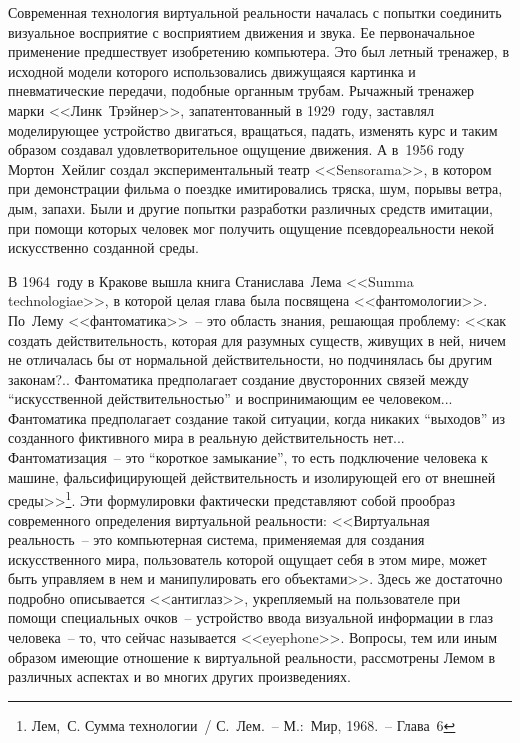   Современная технология виртуальной реальности началась с попытки соединить
  визуальное восприятие с восприятием движения и звука. Ее первоначальное
  применение предшествует изобретению компьютера. Это был летный тренажер, в
  исходной модели которого использовались движущаяся картинка и пневматические
  передачи, подобные органным трубам. Рычажный тренажер марки <<Линк~Трэйнер>>,
  запатентованный в 1929~году, заставлял моделирующее устройство двигаться,
  вращаться, падать, изменять курс и таким образом создавал удовлетворительное
  ощущение движения. А в~1956 году Мортон~Хейлиг создал экспериментальный театр
  <<Sensorama>>, в котором при демонстрации фильма о поездке имитировались
  тряска, шум, порывы ветра, дым, запахи. Были и другие попытки разработки
  различных средств имитации, при помощи которых человек мог получить ощущение
  псевдореальности некой искусственно созданной среды.
  
  В 1964~году в Кракове вышла книга Станислава~Лема <<Summa technologiae>>, в
  которой целая глава была посвящена <<фантомологии>>. По~Лему
  <<фантоматика>>~-- это область знания, решающая проблему: <<как создать
  действительность, которая для разумных существ, живущих в ней, ничем не
  отличалась бы от нормальной действительности, но подчинялась бы другим
  законам?.. Фантоматика предполагает создание двусторонних связей между
  ``искусственной действительностью'' и воспринимающим ее человеком...
  Фантоматика предполагает создание такой ситуации, когда никаких ``выходов''
  из созданного фиктивного мира в реальную действительность нет...
  Фантоматизация~-- это ``короткое замыкание'', то есть подключение человека к
  машине, фальсифицирующей действительность и изолирующей его от внешней
  среды>>\footnote{
    Лем,~С. Сумма технологии~/ С.~Лем.~-- М.:~Мир, 1968.~-- Глава~6}.
  Эти формулировки фактически представляют собой прообраз современного
  определения виртуальной реальности: <<Виртуальная реальность~-- это
  компьютерная система, применяемая для создания искусственного мира,
  пользователь которой ощущает себя в этом мире, может быть управляем в нем и
  манипулировать его объектами>>. Здесь же достаточно подробно описывается
  <<антиглаз>>, укрепляемый на пользователе при помощи специальных очков~--
  устройство ввода визуальной информации в глаз человека~-- то, что сейчас
  называется <<eyephone>>. Вопросы, тем или иным образом имеющие отношение к
  виртуальной реальности, рассмотрены Лемом в различных аспектах и во многих
  других произведениях.
  
